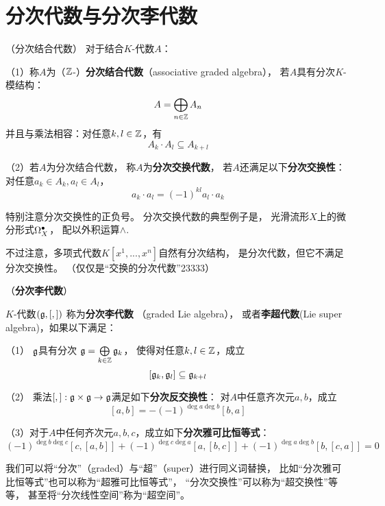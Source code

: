 \section{分次代数与分次李代数}
\begin{definition}（分次结合代数）
对于结合$K$-代数$A$：
\label{分次结合代数-def}

（1）称$A$为（$\mathbb{Z}$-）\textbf{分次结合代数}（associative graded algebra），
若$A$具有分次$K$-模结构：
$$A=\bigoplus_{n\in\mathbb{Z}}A_n$$
并且与乘法相容：对任意$k,l\in\mathbb{Z}$，有
$$A_k\cdot A_l\subseteq A_{k+l}$$

（2）若$A$为分次结合代数，
称$A$为\textbf{分次交换代数}，
若$A$还满足以下\textbf{分次交换性}：
对任意$a_k\in A_k,a_l\in A_l$，
$$a_k\cdot a_l=(-1)^{kl}a_l\cdot a_k$$

\end{definition}

特别注意分次交换性的正负号。
分次交换代数的典型例子是，
光滑流形$X$上的微分形式$\Omega^{\bullet}_X$，
配以外积运算$\wedge$.

不过注意，多项式代数$K[x^1,...,x^n]$自然有分次结构，
是分次代数，但它不满足分次交换性。
{\color{blue}（仅仅是“交换的分次代数”23333）}

\begin{definition}（\textbf{分次李代数}）

$K$-代数$(\mathfrak{g},[,])$ 称为\textbf{分次李代数}
（graded Lie algebra），
或者\textbf{李超代数}(Lie super algebra)，如果以下满足：

（1） $\mathfrak{g}$具有分次
$\mathfrak{g}=\bigoplus\limits_{k\in\mathbb{Z}}\mathfrak{g}_k$，
使得对任意$k,l\in\mathbb{Z}$，成立
$$[\mathfrak{g}_k,\mathfrak{g}_l]\subseteq\mathfrak{g}_{k+l}$$

（2） 乘法$[,]:\mathfrak{g}\times\mathfrak{g}\to\mathfrak{g}$满足如下\textbf{分次反交换性}：
对$A$中任意齐次元$a,b$，成立
$$[a,b]=-(-1)^{\deg a\deg b}[b,a]$$

（3）对于$A$中任何齐次元$a,b,c$，成立如下\textbf{分次雅可比恒等式}：
$$(-1)^{\deg b\deg c}[c,[a,b]]
 +(-1)^{\deg c\deg a}[a,[b,c]]
 +(-1)^{\deg a\deg b}[b,[c,a]]=0$$
\end{definition}

我们可以将“分次”（graded）与“超”（super）进行同义词替换，
比如“分次雅可比恒等式”也可以称为“超雅可比恒等式”，
“分次交换性”可以称为“超交换性”等等，
甚至将“分次线性空间”称为“超空间”。

